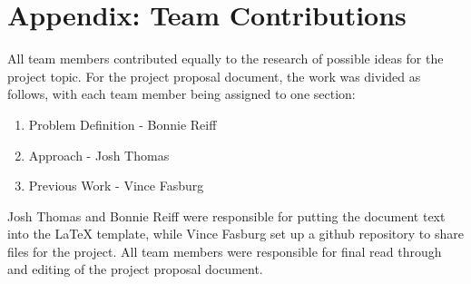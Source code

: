 \documentclass{ieee}
\begin{document}
\appendix 


\section{Appendix: Team Contributions}

All team members contributed equally to the research of possible ideas for the project topic. For the project proposal document, the work was divided as follows, with each team member being assigned to one section:

\begin{enumerate}
\item Problem Definition - Bonnie Reiff
\item Approach - Josh Thomas
\item Previous Work - Vince Fasburg
\end{enumerate}

Josh Thomas and Bonnie Reiff were responsible for putting the document text into the LaTeX template, while Vince Fasburg set up a github repository to share files for the project. All team members were responsible for final read through and editing of the project proposal document.




\end{document}
